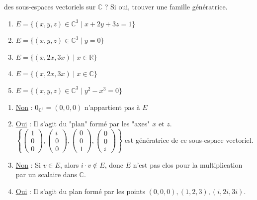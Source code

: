 \documentclass[a4paper, 10pt]{report}
\begin{document}
\begin{enumerate}[label=\arabic*.]
		des sous-espaces vectoriels sur $\mathbb{C}$ ? Si oui, trouver
		une famille génératrice.
		\begin{enumerate}[label=(\alph*)]
			\item $E = \{(x, y, z) \in \mathbb{C}^3 \mid x + 2y + 3z = 1\}$
			\item $E = \{(x, y, z) \in \mathbb{C}^3 \mid y = 0\}$
			\item $E = \{(x, 2x, 3x) \mid x \in \mathbb{R}\}$
			\item $E = \{(x, 2x, 3x) \mid x \in \mathbb{C}\}$
			\item $E = \{(x, y, z) \in \mathbb{C}^3 \mid y^2 -x^3 = 0\}$
		\end{enumerate}
		\colorbox{solution}
		{
			\begin{minipage}{0.9\textwidth}
				\begin{enumerate}[label=(\alph*)]
					\item \underline{Non} : 
						$0_{\mathbb{C}^3} = (0, 0, 0)$
						n'appartient pas à $E$
					\item \underline{Oui} : Il s'agit du "plan" formé
						par les "axes" $x$ et $z$.\\
						$\left\{\left(\begin{smallmatrix}
							1\\ 0 \\ 0
						\end{smallmatrix}\right),
						\left(\begin{smallmatrix}
							i\\ 0 \\ 0
						\end{smallmatrix}\right),
						\left(\begin{smallmatrix}
							0\\ 0 \\ 1
						\end{smallmatrix}\right),
						\left(\begin{smallmatrix}
							0\\ 0 \\ i
						\end{smallmatrix}\right)\right\}$
						est génératrice de ce sous-espace vectoriel.
					\item \underline{Non} : Si $v \in E$, alors
						$i \cdot v \notin E$, donc $E$ n'est pas clos
						pour la multiplication par un scalaire dans
						$\mathbb{C}$.
					\item \underline{Oui} : Il s'agit du plan formé par
						les points $(0, 0, 0), (1, 2, 3), (i, 2i, 3i)$.\\

\end{enumerate}
\end{minipage}}
\end{enumerate}
\end{document}
